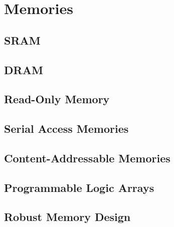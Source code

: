 \section{Memories}

\subsection{SRAM}

\subsection{DRAM}

\subsection{Read-Only Memory}

\subsection{Serial Access Memories}

\subsection{Content-Addressable Memories}

\subsection{Programmable Logic Arrays}

\subsection{Robust Memory Design}
